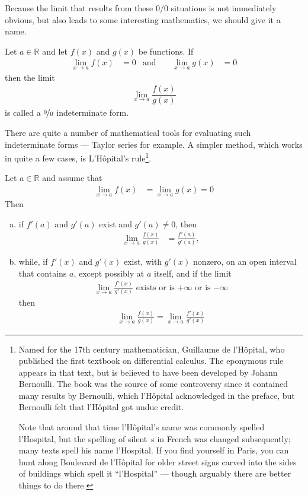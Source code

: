 Because the limit that results from these $0/0$ situations is not immediately obvious,
but also leads to some interesting mathematics, we should give it a name.
\begin{defn}\label{def_3_7_1}
Let $a \in \mathbb{R}$ and let $f(x)$ and $g(x)$ be functions. If
\begin{align*}
  \lim_{x\to a} f(x) &= 0 & \text{and } &&
  \lim_{x\to a} g(x) &= 0
\end{align*}
then the limit
\begin{align*}
  \lim_{x\to a} \dfrac{f(x)}{g(x)}
\end{align*}
is called a $\nicefrac{0}{0}$ indeterminate form.
\end{defn}
There are quite a number of mathematical tools for evaluating such indeterminate forms
--- Taylor series for example. A simpler method, which works in quite a few cases, is
L'H\^opital's rule\footnote{
  Named for the 17th century mathematician, Guillaume de l'H\^opital, who published the
first textbook on differential calculus. The eponymous rule appears in that text, but is
believed to have been developed by Johann Bernoulli. The book was the source of some
controversy since it contained many results by Bernoulli, which l'H\^opital acknowledged
in the preface, but Bernoulli felt that l'H\^opital got undue credit.

Note that around that time l'H\^opital's name was commonly spelled l'Hospital, but the
spelling of silent~s in French was changed subsequently; many texts spell his
name l'Hospital. If you find yourself in Paris, you can hunt along Boulevard
de l'H\^opital for older street signs carved into the sides of buildings
which spell it ``l'Hospital'' --- though arguably there are better things to do
there.}.
\begin{theorem}\label{thm:APPlhopital}
Let $a\in\mathbb{R}$ and assume that
\begin{align*}
\lim_{x\to a}f(x) &= \lim_{x\to a} g(x) = 0
\end{align*}
Then
\begin{enumerate}[(a)]
\item if $f'(a)$ and $g'(a)$ exist and $g'(a)\ne 0$, then
\begin{align*}
\lim_{x\to a} \frac{f(x)}{g(x)} &=\frac{f'(a)}{g'(a)},
\end{align*}
\item while, if $f'(x)$ and $g'(x)$ exist, with $g'(x)$ nonzero, on an open interval that
contains $a$,  except possibly at $a$ itself, and if the limit
\begin{align*}
\lim\limits_{x\rightarrow a}\frac{f'(x)}{g'(x)} \text{ exists or is $+\infty$ or is $-\infty$}
\end{align*}
then
\begin{align*}
\lim_{x\to a} \frac{f(x)}{g(x)}
=\lim_{x \to a} \frac{f'(x)}{g'(x)}
\end{align*}
\end{enumerate}
\end{theorem}

